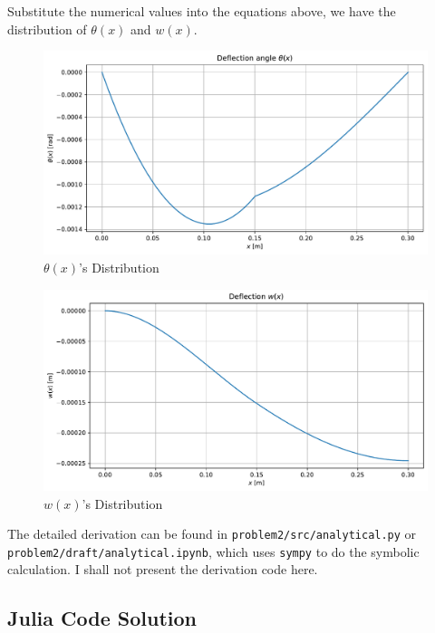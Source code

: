Substitute the numerical values into the equations above,
we have the distribution of $\theta(x)$ and $w(x)$.

\begin{figure}[H]
    \centering
    \includegraphics[width=0.7\linewidth]{../problem2/images/deflection_angle_analytical.pdf}
    \caption{$\theta(x)$'s Distribution}
\end{figure}

\begin{figure}[H]
    \centering
    \includegraphics[width=0.7\linewidth]{../problem2/images/deflection_analytical.pdf}
    \caption{$w(x)$'s Distribution}
\end{figure}
The detailed derivation can be found in 
\verb|problem2/src/analytical.py| or 
\verb|problem2/draft/analytical.ipynb|, 
which uses \verb|sympy| to do the symbolic calculation.
I shall not present the derivation code here.

\subsection{Julia Code Solution}

